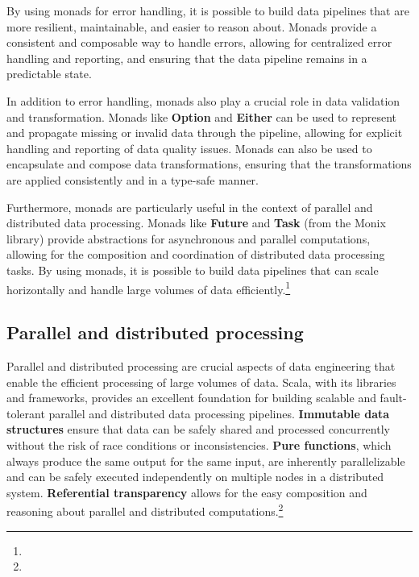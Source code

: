 

By using monads for error handling, it is possible to build data pipelines that are more resilient, maintainable, and easier to reason about. Monads provide a consistent and composable way to handle errors, allowing for centralized error handling and reporting, and ensuring that the data pipeline remains in a predictable state.\footnotemark[3]

In addition to error handling, monads also play a crucial role in data validation and transformation. Monads like \textbf{Option} and \textbf{Either} can be used to represent and propagate missing or invalid data through the pipeline, allowing for explicit handling and reporting of data quality issues. Monads can also be used to encapsulate and compose data transformations, ensuring that the transformations are applied consistently and in a type-safe manner.\footnotemark[3]

Furthermore, monads are particularly useful in the context of parallel and distributed data processing. Monads like \textbf{Future} and \textbf{Task} (from the Monix library) provide abstractions for asynchronous and parallel computations, allowing for the composition and coordination of distributed data processing tasks. By using monads, it is possible to build data pipelines that can scale horizontally and handle large volumes of data efficiently.\footnote[3]{}

\subsection{Parallel and distributed processing}

Parallel and distributed processing are crucial aspects of data engineering that enable the efficient processing of large volumes of data. Scala, with its libraries and frameworks, provides an excellent foundation for building scalable and fault-tolerant parallel and distributed data processing pipelines. \textbf{Immutable data structures} ensure that data can be safely shared and processed concurrently without the risk of race conditions or inconsistencies. \textbf{Pure functions}, which always produce the same output for the same input, are inherently parallelizable and can be safely executed independently on multiple nodes in a distributed system. \textbf{Referential transparency} allows for the easy composition and reasoning about parallel and distributed computations.\footnote[9]{}


